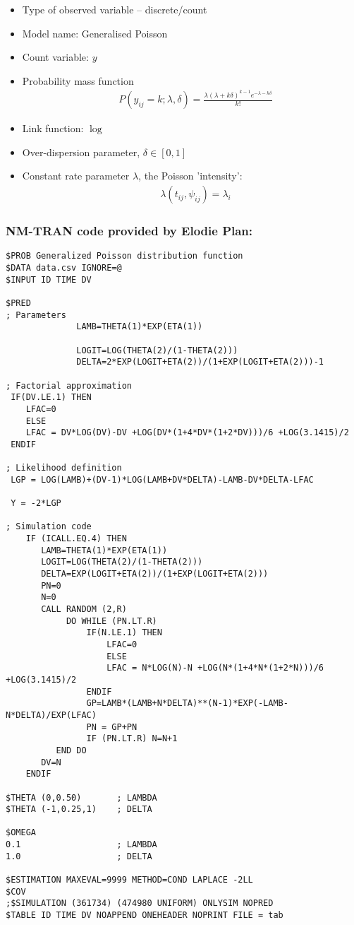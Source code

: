 \begin{itemize}
\item
Type of observed variable -- discrete/count
\item
Model name: Generalised Poisson
\item
Count variable: $y$
\item
Probability mass function
\begin{align}
& P(y_{ij} = k; \lambda, \delta) = \frac{\lambda (\lambda + k \delta)^{k-1} e^{-\lambda - k\delta}}{k!} \nonumber
\end{align}
\item
Link function: $\log$
\item
Over-dispersion parameter, $\delta \in [0,1]$
\item
Constant rate parameter $\lambda$, the Poisson 'intensity': 
\begin{align}
& \lambda(t_{ij}, \psi_{ij}) = \lambda_{i} \nonumber
\end{align}
\end{itemize}

\subsubsection{NM-TRAN code provided by Elodie Plan:}

\myStartLine

\lstset{language=NONMEMdataSet}
\begin{lstlisting}
$PROB Generalized Poisson distribution function
$DATA data.csv IGNORE=@
$INPUT ID TIME DV

$PRED
; Parameters
              LAMB=THETA(1)*EXP(ETA(1))

              LOGIT=LOG(THETA(2)/(1-THETA(2)))
              DELTA=2*EXP(LOGIT+ETA(2))/(1+EXP(LOGIT+ETA(2)))-1

; Factorial approximation
 IF(DV.LE.1) THEN
    LFAC=0
    ELSE
    LFAC = DV*LOG(DV)-DV +LOG(DV*(1+4*DV*(1+2*DV)))/6 +LOG(3.1415)/2
 ENDIF

; Likelihood definition
 LGP = LOG(LAMB)+(DV-1)*LOG(LAMB+DV*DELTA)-LAMB-DV*DELTA-LFAC

 Y = -2*LGP

; Simulation code
    IF (ICALL.EQ.4) THEN
       LAMB=THETA(1)*EXP(ETA(1))
       LOGIT=LOG(THETA(2)/(1-THETA(2)))
       DELTA=EXP(LOGIT+ETA(2))/(1+EXP(LOGIT+ETA(2)))
       PN=0
       N=0
       CALL RANDOM (2,R)
            DO WHILE (PN.LT.R)
                IF(N.LE.1) THEN
                    LFAC=0
                    ELSE
                    LFAC = N*LOG(N)-N +LOG(N*(1+4*N*(1+2*N)))/6 +LOG(3.1415)/2
                ENDIF
                GP=LAMB*(LAMB+N*DELTA)**(N-1)*EXP(-LAMB-N*DELTA)/EXP(LFAC)
                PN = GP+PN
                IF (PN.LT.R) N=N+1
          END DO
       DV=N
    ENDIF

$THETA (0,0.50)       ; LAMBDA
$THETA (-1,0.25,1)    ; DELTA

$OMEGA
0.1                   ; LAMBDA
1.0                   ; DELTA

$ESTIMATION MAXEVAL=9999 METHOD=COND LAPLACE -2LL
$COV
;$SIMULATION (361734) (474980 UNIFORM) ONLYSIM NOPRED
$TABLE ID TIME DV NOAPPEND ONEHEADER NOPRINT FILE = tab
\end{lstlisting}

